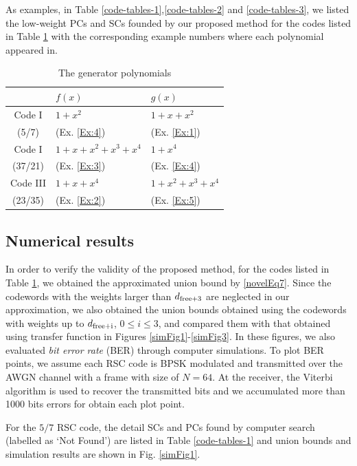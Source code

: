 As examples, in Table \ref{code-tables-1},\ref{code-tables-2} and \ref{code-tables-3}, we listed the low-weight PCs and SCs founded by our proposed method for the codes listed in Table \ref{TB:Codes} with the corresponding example numbers where each polynomial appeared in.
\begin{table}[htbp]
	\caption{The generator polynomials}
	\centering
	\begin{tabular}{cll} 
		\toprule
			& $f(x)$ & $g(x)$ \\ %
		\midrule
		Code I & $1+x^2$ & $1+x+x^2$\\
		(5/7) &  (Ex. \ref{Ex:4}) &  (Ex. \ref{Ex:1}) \\\hline
		Code I& $1+x+x^2+x^3+x^4$& $1+x^4$\\
		(37/21) &  (Ex. \ref{Ex:3}) &  (Ex. \ref{Ex:4})\\\hline
		Code III& $1+x+x^4$& $1+x^2+x^3+x^4$\\
		(23/35) &  (Ex. \ref{Ex:2}) &  (Ex. \ref{Ex:5})\\
		\bottomrule
	\end{tabular}
	\label{TB:Codes}
\end{table}

\subsection{Numerical results}

In order to verify the validity of the proposed method, for the codes listed in Table \ref{TB:Codes}, we obtained the approximated union bound by \eqref{novelEq7}. Since the codewords with the weights larger than $d_{\rm free+3}$ are neglected in our approximation, we also obtained the union bounds obtained using the codewords with weights up to $d_{\rm free+i}$, $0 \leq i \leq 3$, and compared them with that obtained using transfer function in Figures \ref{simFig1}-\ref{simFig3}.
%
In these figures, we also evaluated {\it bit error rate} (BER) through computer simulations. To plot BER points, we assume each RSC code is BPSK modulated and transmitted over the AWGN channel with a frame with size of $N=64$. At the receiver, the Viterbi algorithm is used to recover the transmitted bits and we accumulated more than 1000 bits errors for obtain each plot point.

For the $5/7$ RSC code, the detail SCs and PCs found by computer search (labelled as `Not Found') are listed in Table \ref{code-tables-1} and union bounds and simulation results are shown in Fig. \ref{simFig1}.

